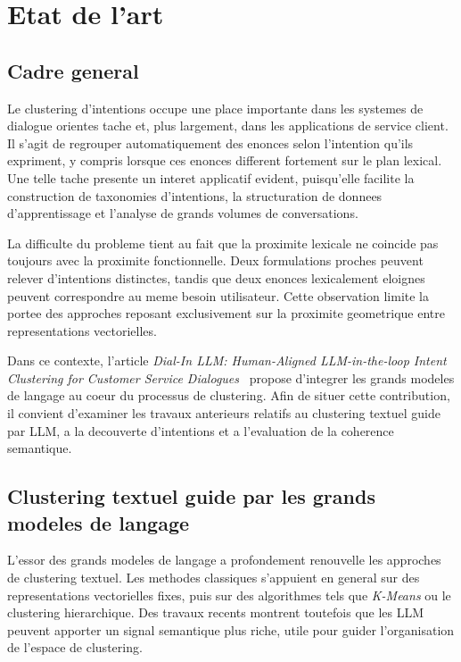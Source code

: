 \chapter{Etat de l'art}

\section{Cadre general}

Le clustering d'intentions occupe une place importante dans les systemes de
dialogue orientes tache et, plus largement, dans les applications de service
client. Il s'agit de regrouper automatiquement des enonces selon l'intention
qu'ils expriment, y compris lorsque ces enonces different fortement sur le plan
lexical. Une telle tache presente un interet applicatif evident, puisqu'elle
facilite la construction de taxonomies d'intentions, la structuration de
donnees d'apprentissage et l'analyse de grands volumes de conversations.

La difficulte du probleme tient au fait que la proximite lexicale ne coincide
pas toujours avec la proximite fonctionnelle. Deux formulations proches peuvent
relever d'intentions distinctes, tandis que deux enonces lexicalement eloignes
peuvent correspondre au meme besoin utilisateur. Cette observation limite la
portee des approches reposant exclusivement sur la proximite geometrique entre
representations vectorielles.

Dans ce contexte, l'article \emph{Dial-In LLM: Human-Aligned LLM-in-the-loop
Intent Clustering for Customer Service Dialogues}~\cite{hong2025dialinllm}
propose d'integrer les grands modeles de langage au coeur du processus de
clustering. Afin de situer cette contribution, il convient d'examiner les
travaux anterieurs relatifs au clustering textuel guide par LLM, a la
decouverte d'intentions et a l'evaluation de la coherence semantique.

\section{Clustering textuel guide par les grands modeles de langage}

L'essor des grands modeles de langage a profondement renouvelle les approches
de clustering textuel. Les methodes classiques s'appuient en general sur des
representations vectorielles fixes, puis sur des algorithmes tels que
\emph{K-Means} ou le clustering hierarchique. Des travaux recents montrent
toutefois que les LLM peuvent apporter un signal semantique plus riche, utile
pour guider l'organisation de l'espace de clustering.

